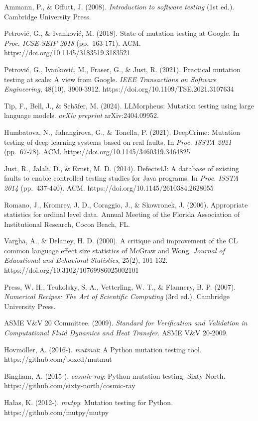 \documentclass[review,12pt,authoryear]{elsarticle}
\begin{document}
Ammann, P., \& Offutt, J. (2008). \emph{Introduction to software
testing} (1st ed.). Cambridge University Press.

Petrović, G., \& Ivanković, M. (2018). State of mutation testing at
Google. In \emph{Proc. ICSE-SEIP 2018} (pp.~163-171). ACM.
https://doi.org/10.1145/3183519.3183521

Petrović, G., Ivanković, M., Fraser, G., \& Just, R. (2021). Practical
mutation testing at scale: A view from Google. \emph{IEEE Transactions
on Software Engineering}, 48(10), 3900-3912.
https://doi.org/10.1109/TSE.2021.3107634

Tip, F., Bell, J., \& Schäfer, M. (2024). LLMorpheus: Mutation testing
using large language models. \emph{arXiv preprint} arXiv:2404.09952.

Humbatova, N., Jahangirova, G., \& Tonella, P. (2021). DeepCrime:
Mutation testing of deep learning systems based on real faults. In
\emph{Proc. ISSTA 2021} (pp.~67-78). ACM.
https://doi.org/10.1145/3460319.3464825

Just, R., Jalali, D., \& Ernst, M. D. (2014). Defects4J: A database of
existing faults to enable controlled testing studies for Java programs.
In \emph{Proc. ISSTA 2014} (pp.~437-440). ACM.
https://doi.org/10.1145/2610384.2628055

Romano, J., Kromrey, J. D., Coraggio, J., \& Skowronek, J. (2006).
Appropriate statistics for ordinal level data. Annual Meeting of the
Florida Association of Institutional Research, Cocoa Beach, FL.

Vargha, A., \& Delaney, H. D. (2000). A critique and improvement of the
CL common language effect size statistics of McGraw and Wong.
\emph{Journal of Educational and Behavioral Statistics}, 25(2), 101-132.
https://doi.org/10.3102/10769986025002101

Press, W. H., Teukolsky, S. A., Vetterling, W. T., \& Flannery, B. P.
(2007). \emph{Numerical Recipes: The Art of Scientific Computing} (3rd
ed.). Cambridge University Press.

ASME V\&V 20 Committee. (2009). \emph{Standard for Verification and
Validation in Computational Fluid Dynamics and Heat Transfer}. ASME V\&V
20-2009.

Hovmöller, A. (2016-). \emph{mutmut}: A Python mutation testing tool.
https://github.com/boxed/mutmut

Bingham, A. (2015-). \emph{cosmic-ray}: Python mutation testing. Sixty
North. https://github.com/sixty-north/cosmic-ray

Hałas, K. (2012-). \emph{mutpy}: Mutation testing for Python.
https://github.com/mutpy/mutpy
\end{document}
